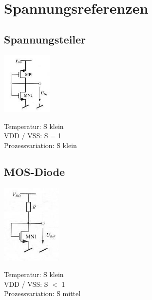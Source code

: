 \newpage
\section{Spannungsreferenzen}

\begin{multicols}{2}
	\subsection{Spannungsteiler}
	\begin{minipage}{0.4\linewidth}
		\includegraphics[width=2.5cm]{images/FET_Spannungsteiler.png} \\
	\end{minipage}
	\begin{minipage}{0.6\linewidth}
		Temperatur: S klein \\
		VDD / VSS: S = 1 \\
		Prozessvariation: S klein \\
	\end{minipage}
	
	\subsection{MOS-Diode}
	\begin{minipage}{0.4\linewidth}
		\includegraphics[width=3cm]{images/Diode_Spannungsteiler.png} \\
	\end{minipage}
	\begin{minipage}{0.6\linewidth}
		Temperatur: S klein \\
		VDD / VSS: S $<$ 1 \\
		Prozessvariation: S mittel \\
	\end{minipage}	


\end{multicols}
